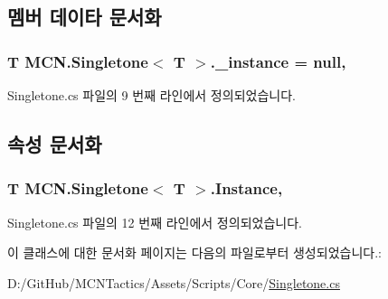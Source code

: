 \subsection{멤버 데이타 문서화}
\subsubsection[{\texorpdfstring{\+\_\+instance}{_instance}}]{\setlength{\rightskip}{0pt plus 5cm}T {\bf M\+C\+N.\+Singletone}$<$ T $>$.\+\_\+instance = null\hspace{0.3cm}{\ttfamily [static]}, {\ttfamily [protected]}}\hypertarget{class_m_c_n_1_1_singletone_a267e8a9e6e7c073b988cda4f95e26eb1}{}\label{class_m_c_n_1_1_singletone_a267e8a9e6e7c073b988cda4f95e26eb1}


Singletone.\+cs 파일의 9 번째 라인에서 정의되었습니다.



\subsection{속성 문서화}
\subsubsection[{\texorpdfstring{Instance}{Instance}}]{\setlength{\rightskip}{0pt plus 5cm}T {\bf M\+C\+N.\+Singletone}$<$ T $>$.Instance\hspace{0.3cm}{\ttfamily [static]}, {\ttfamily [get]}}\hypertarget{class_m_c_n_1_1_singletone_a46dbbebd93e96a9592a9803c51f35602}{}\label{class_m_c_n_1_1_singletone_a46dbbebd93e96a9592a9803c51f35602}


Singletone.\+cs 파일의 12 번째 라인에서 정의되었습니다.



이 클래스에 대한 문서화 페이지는 다음의 파일로부터 생성되었습니다.\+:\begin{DoxyCompactItemize}
\item 
D\+:/\+Git\+Hub/\+M\+C\+N\+Tactics/\+Assets/\+Scripts/\+Core/\hyperlink{_singletone_8cs}{Singletone.\+cs}\end{DoxyCompactItemize}
